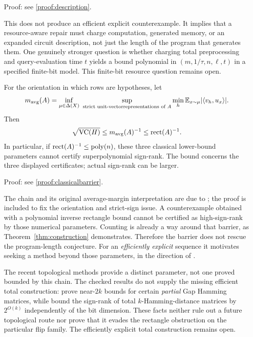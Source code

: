 \noindent Proof: see \cref{proof:description}.\par


This does not produce an efficient explicit counterexample. It implies that a resource-aware repair must charge computation, generated memory, or an expanded circuit description, not just the length of the program that generates them. One genuinely stronger question is whether charging total preprocessing and query-evaluation time $t$ yields a bound polynomial in $(m,1/\tau,n,\ell,t)$ in a specified finite-bit model. This finite-bit resource question remains open.



\begin{proposition}\label{thm:classicalbarrier}
For the orientation in which rows are hypotheses, let
\[
 m_{\rm avg}(A)=\inf_{\mu\in\Delta(X)}\ 
 \sup_{\substack{\text{strict unit-vector}\text{representations of }A}}
 \min_h\E_{x\sim\mu}|\langle v_h,u_x\rangle|.
\]
Then
\[
 \sqrt{\operatorname{VC}(H)}\le m_{\rm avg}(A)^{-1}\le\operatorname{rect}(A)^{-1}.
\]
In particular, if $\operatorname{rect}(A)^{-1}\le\operatorname{poly}(n)$, these three classical lower-bound parameters cannot certify superpolynomial sign-rank. The bound concerns the three displayed certificates; actual sign-rank can be larger.
\end{proposition}

\noindent Proof: see \cref{proof:classicalbarrier}.\par


The chain and its original average-margin interpretation are due to \citet{HHPTZ22}; the proof is included to fix the orientation and strict-sign issue. A counterexample obtained with a polynomial inverse rectangle bound cannot be certified as high-sign-rank by those numerical parameters. Counting is already a way around that barrier, as Theorem~\ref{thm:construction} demonstrates. Therefore the barrier does not rescue the program-length conjecture. For an \emph{efficiently explicit} sequence it motivates seeking a method beyond those parameters, in the direction of \citet[Problem~4.1]{HHPTZ22}.

The recent topological methods provide a distinct parameter, not one proved bounded by this chain. The checked results do not supply the missing efficient total construction: \citet{FHV26} prove near-$2k$ bounds for certain \emph{partial} Gap Hamming matrices, while \citet{GHIS25} bound the sign-rank of total $k$-Hamming-distance matrices by $2^{O(k)}$ independently of the bit dimension. These facts neither rule out a future topological route nor prove that it evades the rectangle obstruction on the particular flip family. The efficiently explicit total construction remains open.




